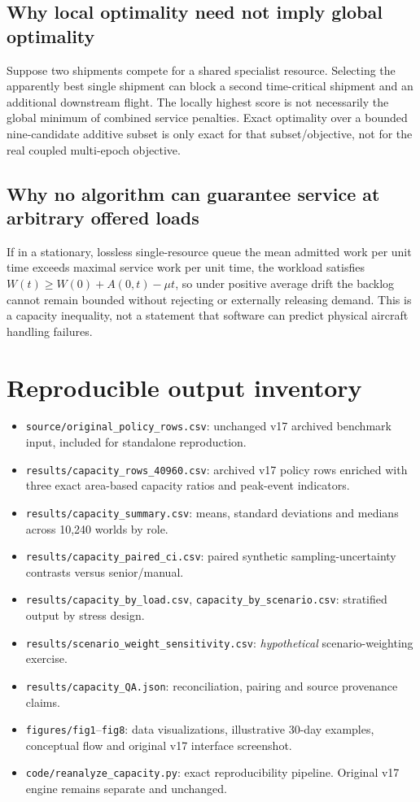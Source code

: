 \documentclass[10pt,a4paper]{article}
\theoremstyle{definition}\newtheorem{definition}[theorem]{Definition}
\theoremstyle{remark}\newtheorem{remark}[theorem]{Remark}
\newcommand{\1}{\mathbbm 1}
\begin{document}
\subsection{Why local optimality need not imply global optimality}
Suppose two shipments compete for a shared specialist resource. Selecting the apparently best single shipment can block a second time-critical shipment and an additional downstream flight. The locally highest score is not necessarily the global minimum of combined service penalties. Exact optimality over a bounded nine-candidate additive subset is only exact for that subset/objective, not for the real coupled multi-epoch objective.

\subsection{Why no algorithm can guarantee service at arbitrary offered loads}
If in a stationary, lossless single-resource queue the mean admitted work per unit time exceeds maximal service work per unit time, the workload satisfies $W(t)\ge W(0)+A(0,t)-\mu t$, so under positive average drift the backlog cannot remain bounded without rejecting or externally releasing demand. This is a capacity inequality, not a statement that software can predict physical aircraft handling failures.

\section{Reproducible output inventory}
\begin{itemize}
\item \texttt{source/original\_policy\_rows.csv}: unchanged v17 archived benchmark input, included for standalone reproduction.
\item \texttt{results/capacity\_rows\_40960.csv}: archived v17 policy rows enriched with three exact area-based capacity ratios and peak-event indicators.
\item \texttt{results/capacity\_summary.csv}: means, standard deviations and medians across 10,240 worlds by role.
\item \texttt{results/capacity\_paired\_ci.csv}: paired synthetic sampling-uncertainty contrasts versus senior/manual.
\item \texttt{results/capacity\_by\_load.csv}, \texttt{capacity\_by\_scenario.csv}: stratified output by stress design.
\item \texttt{results/scenario\_weight\_sensitivity.csv}: \emph{hypothetical} scenario-weighting exercise.
\item \texttt{results/capacity\_QA.json}: reconciliation, pairing and source provenance claims.
\item \texttt{figures/fig1}--\texttt{fig8}: data visualizations, illustrative 30-day examples, conceptual flow and original v17 interface screenshot.
\item \texttt{code/reanalyze\_capacity.py}: exact reproducibility pipeline. Original v17 engine remains separate and unchanged.
\end{itemize}
\end{document}
